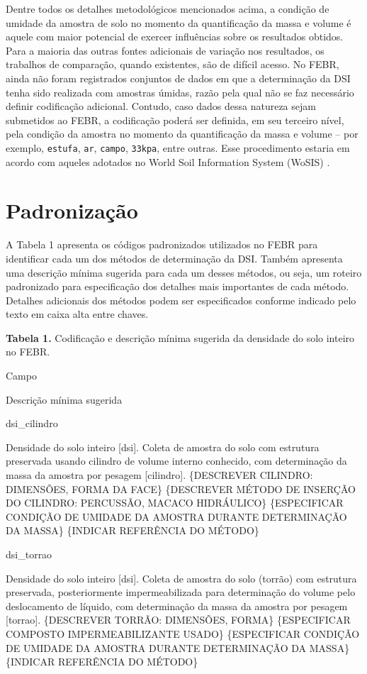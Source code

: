 \documentclass[
]{book}
\begin{document}
Dentre todos os detalhes metodológicos mencionados acima, a condição de umidade da amostra de solo no momento da quantificação da massa e volume é aquele com maior potencial de exercer influências sobre os resultados obtidos. Para a maioria das outras fontes adicionais de variação nos resultados, os trabalhos de comparação, quando existentes, são de difícil acesso. No FEBR, ainda não foram registrados conjuntos de dados em que a determinação da DSI tenha sido realizada com amostras úmidas, razão pela qual não se faz necessário definir codificação adicional. Contudo, caso dados dessa natureza sejam submetidos ao FEBR, a codificação poderá ser definida, em seu terceiro nível, pela condição da amostra no momento da quantificação da massa e volume -- por exemplo, \texttt{estufa}, \texttt{ar}, \texttt{campo}, \texttt{33kpa}, entre outras. Esse procedimento estaria em acordo com aqueles adotados no World Soil Information System (WoSIS) \citep{RibeiroEtAl2018}.

\hypertarget{padronizauxe7uxe3o-1}{%
\section{Padronização}\label{padronizauxe7uxe3o-1}}

A Tabela 1 apresenta os códigos padronizados utilizados no FEBR para identificar cada um dos métodos de determinação da DSI. Também apresenta uma descrição mínima sugerida para cada um desses métodos, ou seja, um roteiro padronizado para especificação dos detalhes mais importantes de cada método. Detalhes adicionais dos métodos podem ser especificados conforme indicado pelo texto em caixa alta entre chaves.

\textbf{Tabela 1.} Codificação e descrição mínima sugerida da densidade do solo inteiro no FEBR.

Campo

Descrição mínima sugerida

dsi\_cilindro

Densidade do solo inteiro {[}dsi{]}. Coleta de amostra do solo com estrutura preservada usando cilindro de volume interno conhecido, com determinação da massa da amostra por pesagem {[}cilindro{]}. \{DESCREVER CILINDRO: DIMENSÕES, FORMA DA FACE\} \{DESCREVER MÉTODO DE INSERÇÃO DO CILINDRO: PERCUSSÃO, MACACO HIDRÁULICO\} \{ESPECIFICAR CONDIÇÃO DE UMIDADE DA AMOSTRA DURANTE DETERMINAÇÃO DA MASSA\} \{INDICAR REFERÊNCIA DO MÉTODO\}

dsi\_torrao

Densidade do solo inteiro {[}dsi{]}. Coleta de amostra do solo (torrão) com estrutura preservada, posteriormente impermeabilizada para determinação do volume pelo deslocamento de líquido, com determinação da massa da amostra por pesagem {[}torrao{]}. \{DESCREVER TORRÃO: DIMENSÕES, FORMA\} \{ESPECIFICAR COMPOSTO IMPERMEABILIZANTE USADO\} \{ESPECIFICAR CONDIÇÃO DE UMIDADE DA AMOSTRA DURANTE DETERMINAÇÃO DA MASSA\} \{INDICAR REFERÊNCIA DO MÉTODO\}
\end{document}
